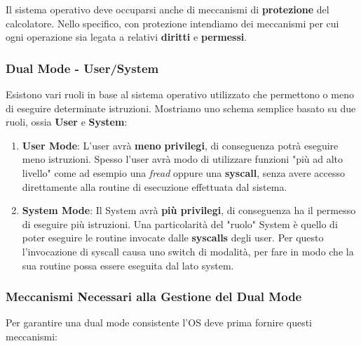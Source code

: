\documentclass{article}
\begin{document}
Il sistema operativo deve occuparsi anche di meccanismi di \textbf{protezione} del calcolatore. Nello specifico, con protezione intendiamo dei meccanismi per cui ogni operazione sia legata a relativi \textbf{diritti} e \textbf{permessi}.

\vspace*{15px}

\subsubsection{Dual Mode - User/System}

Esistono vari ruoli in base al sistema operativo utilizzato che permettono o meno di eseguire determinate istruzioni. Mostriamo uno schema semplice basato su due ruoli, ossia \textbf{User} e \textbf{System}:

    \vspace*{10px}


\begin{enumerate}
    \item \textbf{User Mode}: L'user avrà \textbf{meno} \textbf{privilegi}, di conseguenza potrà eseguire meno istruzioni. Spesso l'user avrà modo di utilizzare funzioni "più ad alto livello" come ad esempio una \textit{fread} oppure una \textbf{syscall}, senza avere accesso direttamente alla routine di esecuzione effettuata dal sistema.
    \item \textbf{System Mode}: Il System avrà \textbf{più privilegi}, di conseguenza ha il permesso di eseguire più istruzioni. Una particolarità del "ruolo" System è quello di poter eseguire le routine invocate dalle \textbf{syscalls} degli user. Per questo l'invocazione di syscall causa uno switch di modalità, per fare in modo che la sua routine possa essere eseguita dal lato system.
\end{enumerate}

\vspace*{15px}

\subsubsection{Meccanismi Necessari alla Gestione del Dual Mode}

Per garantire una dual mode consistente l'OS deve prima fornire questi meccanismi:
\end{document}
